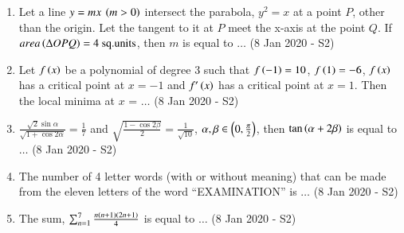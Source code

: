 \documentclass[journal]{IEEEtran}
\begin{document}
\begin{enumerate}
    \item Let a line $y = mx \: \left(m > 0\right)$ intersect the parabola, $y^2 = x$ at a point $P$, other than the origin. Let the tangent to it at $P$ meet the x-axis at the point $Q$. If $area\left(\Delta OPQ\right) = 4 \text{ sq.units}$, then $m$ is equal to $\ldots$ \hfill (8 Jan 2020 - S2)\\
    
    \item Let $f\left(x\right)$ be a polynomial of degree 3 such that $f\left(-1\right) = 10$, $f\left(1\right) = -6$, $f\left(x\right)$ has a critical point at $x = -1$ and $f^\prime\left(x\right)$ has a critical point at $x = 1$. Then the local minima at $x$ = $\ldots$ \hfill (8 Jan 2020 - S2)\\
    
    \item $\frac{\sqrt{2}\sin\alpha}{\sqrt{1 + \cos2\alpha}} = \frac{1}{7}$ and $\sqrt{\frac{1-\cos2\beta}{2}} = \frac{1}{\sqrt{10}}$, $\alpha, \beta \in \left(0, \frac{\pi}{2}\right)$, then $\tan\left(\alpha + 2\beta\right)$ is equal to $\ldots$ \hfill (8 Jan 2020 - S2)\\
    
    \item The number of 4 letter words (with or without meaning) that can be made from the eleven letters of the word ``EXAMINATION'' is $\ldots$ \hfill (8 Jan 2020 - S2)\\
    
    \item The sum, $\sum_{n=1}^{7}\frac{n\left(n+1\right)\left(2n+1\right)}{4}$ is equal to $\ldots$ \hfill (8 Jan 2020 - S2)\\
\end{enumerate}
\end{document}

